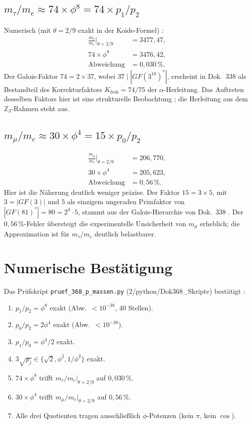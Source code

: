 \subsection{$m_\tau/m_e \approx 74\times\phi^8 = 74\times p_1/p_2$}

Numerisch (mit $\theta=2/9$ exakt in der Koide-Formel) \KM:
\begin{align}
  \frac{m_\tau}{m_e}\bigl|_{\theta=2/9} &= 3477{,}47,\\
  74\times\phi^8 &= 3476{,}42,\\
  \text{Abweichung} &= 0{,}030\,\%.
\end{align}
Der Galois-Faktor $74=2\times37$, wobei $37\mid|GF(3^{18})^*|$, erscheint in Dok.~338
als Bestandteil des Korrekturfaktors $K_\text{frak}=74/75$ der $\alpha$-Herleitung.
Das Auftreten desselben Faktors hier ist eine strukturelle Beobachtung \SM; die
Herleitung aus dem $\mathbb{Z}_3$-Rahmen steht aus.

\subsection{$m_\mu/m_e \approx 30\times\phi^4 = 15\times p_0/p_2$}

\begin{align}
  \frac{m_\mu}{m_e}\bigl|_{\theta=2/9} &= 206{,}770,\\
  30\times\phi^4 &= 205{,}623,\\
  \text{Abweichung} &= 0{,}56\,\%.
\end{align}
Hier ist die Näherung deutlich weniger präzise. Der Faktor $15=3\times5$, mit
$3=|GF(3)|$ und $5$ als einzigem ungeraden Primfaktor von $|GF(81)^*| = 80 = 2^4\cdot5$, stammt aus der Galois-Hierarchie
von Dok.~338 \SM. Der $0{,}56\,\%$-Fehler übersteigt die experimentelle Unsicherheit
von $m_\mu$ erheblich; die Approximation ist für $m_\tau/m_e$ deutlich belastbarer.

\section{Numerische Bestätigung}

Das Prüfskript \texttt{pruef\_368\_p\_massen.py} (2/python/Dok368\_Skripte) bestätigt \KM:
\begin{enumerate}
  \item $p_1/p_2=\phi^8$ exakt (Abw.\ $<10^{-38}$, 40 Stellen).
  \item $p_0/p_2=2\phi^4$ exakt (Abw.\ $<10^{-38}$).
  \item $p_1/p_0=\phi^4/2$ exakt.
  \item $3\sqrt{p_j}\in\{\sqrt2,\phi^2,1/\phi^2\}$ exakt.
  \item $74\times\phi^8$ trifft $m_\tau/m_e|_{\theta=2/9}$ auf $0{,}030\,\%$.
  \item $30\times\phi^4$ trifft $m_\mu/m_e|_{\theta=2/9}$ auf $0{,}56\,\%$.
  \item Alle drei Quotienten tragen ausschließlich $\phi$-Potenzen (kein $\pi$, kein $\cos$).
\end{enumerate}

